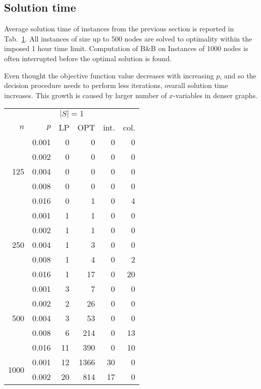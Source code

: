 \subsection{Solution time}

Average solution time of instances from the previous section is reported in Tab.~\ref{tab:soltime}.
All instances of size up to 500 nodes are solved to optimality within the imposed 1 hour time limit.
Computation of B\&B on Instances of 1000 nodes is often interrupted before the optimal solution is found.


Even thought the objective function value decreases with increasing $p$, and so the decision procedure needs to perform less iterations, ovarall solution time increases.
This growth is caused by larger number of $x$-variables in denser graphs.

\begin{table}[]
\label{tab:soltime}
\begin{minipage}{.45\linewidth}
\begin{tabular}{rrrrrr}
\multicolumn{6}{c}{$|S|=1$} \\
$n$ & $p$ & LP  & OPT & int. & col. \\
\hline
\multirow{5}{*}{125} 
 & 0.001 & 0   &  0 & 0 & 0 \\ 
 & 0.002 & 0   &  0 & 0 & 0 \\
 & 0.004 & 0   &  0 & 0 & 0 \\
 & 0.008 & 0   &  0 & 0 & 0 \\
 & 0.016 & 0   &  1 & 0 & 4 \\
\hline                      
\multirow{5}{*}{250}        
 & 0.001 &  1  &  1 & 0 & 0 \\
 & 0.002 &  1  &  1 & 0 & 0 \\
 & 0.004 &  1  &  3 & 0 & 0 \\
 & 0.008 &  1  &  4 & 0 & 2 \\
 & 0.016 &  1  & 17 & 0 &20 \\
\hline                      
\multirow{5}{*}{500}        
 & 0.001 & 3   &  7 & 0 & 0 \\
 & 0.002 & 2   & 26 & 0 & 0 \\
 & 0.004 & 3   & 53 & 0 & 0 \\
 & 0.008 & 6   &214 & 0 &13 \\
 & 0.016 &11   &390 & 0 &10 \\
\hline                      
\multirow{5}{*}{1000}        
 & 0.001 & 12  &1366& 30& 0 \\
 & 0.002 & 20  & 814& 17& 0 \\

\end{tabular}
\end{minipage}
\end{table}

